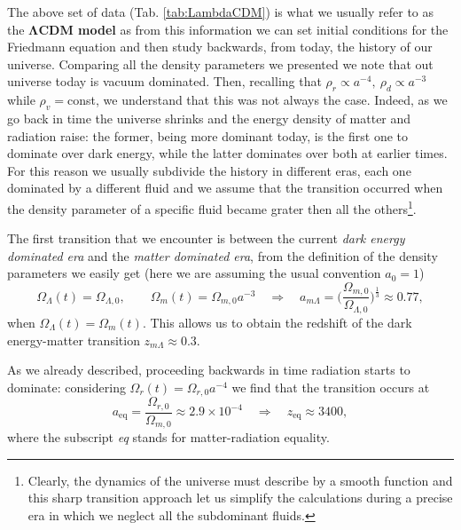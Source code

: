 The above set of data (Tab. \ref{tab:LambdaCDM}) is what we usually refer to as the $\boldsymbol{\Lambda}$\textbf{CDM model} as from this information we can set initial conditions for the Friedmann equation and then study backwards, from today, the history of our universe. Comparing all the density parameters we presented we note that out universe today is vacuum dominated. Then, recalling that $\rho_r\propto a^{-4},\ \rho_d\propto a^{-3}$ while $\rho_v=$const, we understand that this was not always the case. Indeed, as we go back in time the universe shrinks and the energy density of matter and radiation raise: the former, being more dominant today, is the first one to dominate over dark energy, while the latter dominates over both at earlier times.\\
For this reason we usually subdivide the history in different eras, each one dominated by a different fluid and we assume that the transition occurred when the density parameter of a specific fluid became grater then all the others\footnote{Clearly, the dynamics of the universe must describe by a smooth function and this sharp transition approach let us simplify the calculations during a precise era in which we neglect all the subdominant fluids.}.

The first transition that we encounter is between the current \emph{dark energy dominated era} and the \emph{matter dominated era}, from the definition of the density parameters we easily get (here we are assuming the usual convention $a_0=1$)
$$\Omega_\Lambda(t)=\Omega_{\Lambda,0},\qquad \Omega_m(t)=\Omega_{m,0}a^{-3}\quad \Rightarrow\quad a_{m\Lambda}=\bigg(\frac{\Omega_{m,0}}{\Omega_{\Lambda,0}}\bigg)^\frac{1}{3}\approx0.77,$$
when $\Omega_\Lambda(t)=\Omega_m(t)$. This allows us to obtain the redshift of the dark energy-matter transition $z_{m\Lambda}\approx0.3$.

As we already described, proceeding backwards in time radiation starts to dominate: considering $\Omega_r(t)=\Omega_{r,0}a^{-4}$ we find that the transition occurs at
$$a_\text{eq}=\frac{\Omega_{r,0}}{\Omega_{m,0}}\approx2.9\times10^{-4}\quad \Rightarrow\quad z_\text{eq}\approx3400,$$ where the subscript \emph{eq} stands for matter-radiation equality. 

